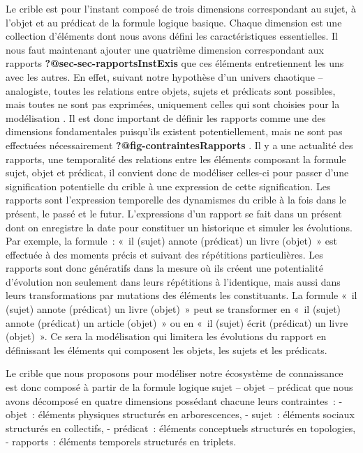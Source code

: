 \documentclass[
  a4paper,
  DIV=11,
  numbers=noendperiod]{scrreprt}
\begin{document}
Le crible est pour l'instant composé de trois dimensions correspondant
au sujet, à l'objet et au prédicat de la formule logique basique. Chaque
dimension est une collection d'éléments dont nous avons défini les
caractéristiques essentielles. Il nous faut maintenant ajouter une
quatrième dimension correspondant aux rapports
\textbf{?@sec-sec-rapportsInstExis} que ces éléments entretiennent les
uns avec les autres. En effet, suivant notre hypothèse d'un univers
chaotique -- analogiste, toutes les relations entre objets, sujets et
prédicats sont possibles, mais toutes ne sont pas exprimées, uniquement
celles qui sont choisies pour la modélisation . Il est donc important de
définir les rapports comme une des dimensions fondamentales puisqu'ils
existent potentiellement, mais ne sont pas effectuées nécessairement
\textbf{?@fig-contraintesRapports} . Il y a une actualité des rapports,
une temporalité des relations entre les éléments composant la formule
sujet, objet et prédicat, il convient donc de modéliser celles-ci pour
passer d'une signification potentielle du crible à une expression de
cette signification. Les rapports sont l'expression temporelle des
dynamismes du crible à la fois dans le présent, le passé et le futur.
L'expressions d'un rapport se fait dans un présent dont on enregistre la
date pour constituer un historique et simuler les évolutions. Par
exemple, la formule~: «~il (sujet) annote (prédicat) un livre (objet)~»
est effectuée à des moments précis et suivant des répétitions
particulières. Les rapports sont donc génératifs dans la mesure où ils
créent une potentialité d'évolution non seulement dans leurs répétitions
à l'identique, mais aussi dans leurs transformations par mutations des
éléments les constituants. La formule «~il (sujet) annote (prédicat) un
livre (objet)~» peut se transformer en «~il (sujet) annote (prédicat) un
article (objet)~» ou en «~il (sujet) écrit (prédicat) un livre
(objet)~». Ce sera la modélisation qui limitera les évolutions du
rapport en définissant les éléments qui composent les objets, les sujets
et les prédicats.

Le crible que nous proposons pour modéliser notre écosystème de
connaissance est donc composé à partir de la formule logique sujet --
objet -- prédicat que nous avons décomposé en quatre dimensions
possédant chacune leurs contraintes~: - objet~: éléments physiques
structurés en arborescences, - sujet~: éléments sociaux structurés en
collectifs, - prédicat~: éléments conceptuels structurés en topologies,
- rapports~: éléments temporels structurés en triplets.
\end{document}
